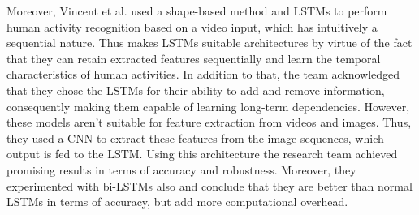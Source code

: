 Moreover, Vincent et al. used a shape-based method and LSTMs to perform human activity recognition based on a video input, which has intuitively a sequential nature. Thus makes LSTMs suitable architectures by virtue of the fact that they can retain extracted features sequentially and learn the temporal characteristics of human activities. In addition to that, the team acknowledged that they chose the LSTMs for their ability to add and remove information, consequently making them capable of learning long-term dependencies. However, these models aren't suitable for feature extraction from videos and images. Thus, they used a CNN to extract these features from the image sequences, which output is fed to the LSTM. Using this architecture the research team achieved promising results in terms of accuracy and robustness. Moreover, they experimented with bi-LSTMs also and conclude that they are better than normal LSTMs in terms of accuracy, but add more computational overhead\cite{vincent2020human}.\newline
